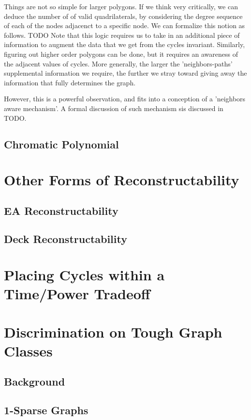 \documentclass[11pt,a4paper]{report}
\begin{document}
Things are not so simple for larger polygons.  If we think very critically, we can deduce the number of of valid quadrilaterals, by considering the degree sequence of each of the nodes adjacenct to a specific node.
We can formalize this notion as follows.
TODO
Note that this logic requires us to take in an additional piece of information to augment the data that we get from the cycles invariant.
Similarly, figuring out higher order polygons can be done, but it requires an awareness of the adjacent values of cycles.
More generally, the larger the 'neighbors-paths' supplemental information we require, the further we stray toward giving away the information that fully determines the graph.

However, this is a powerful observation, and fits into a conception of a 'neighbors aware mechanism'. A formal discussion of such mechanism sis discussed in TODO.

\subsection{Chromatic Polynomial}

\section{Other Forms of Reconstructability}
\subsection{EA Reconstructability}
\subsection{Deck Reconstructability}

\section{Placing Cycles within a Time/Power Tradeoff}

\section{Discrimination  on Tough Graph Classes}
\subsection{Background}
\subsection{1-Sparse Graphs}
\end{document}

